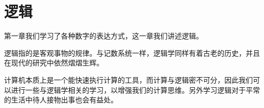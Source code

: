 \chapter{逻辑}\label{ch:Logic}
    第一章我们学习了各种数字的表达方式，这一章我们讲述逻辑。

    逻辑指的是客观事物的规律。与记数系统一样，逻辑学同样有着古老的历史，并且在现代的研究中依然熠熠生辉。

    计算机本质上是一个能快速执行计算的工具，而计算与逻辑密不可分，因此我们可以进行一些与逻辑学相关的学习，以增强我们的计算思维。另外学习逻辑对于平常的生活中待人接物出事也会有益处。
